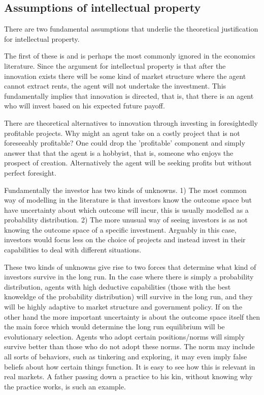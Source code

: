 \subsection{Assumptions of intellectual property}


There are two fundamental assumptions that underlie the theoretical justification for intellectual property. 

The first of these is  and is perhaps the most commonly ignored in the economics literature. Since the argument for intellectual property is that after the innovation exists there will be some kind of market structure where the agent cannot extract rents, the agent will not undertake the investment. This fundamentally implies that innovation is directed, that is, that there is an agent who will invest based on his expected future payoff.

There are theoretical alternatives to innovation through investing in foresightedly profitable projects. Why might an agent take on a costly project that is not foreseeably profitable? One could drop the 'profitable' component and simply answer that that the agent is a hobbyist, that is, someone who enjoys the prospect of creation. Alternatively the agent will be seeking profits but without perfect foresight. 

Fundamentally the investor has two kinds of unknowns. 1) The most common way of modelling in the literature is that investors know the outcome space but have uncertainty about which outcome will incur, this is usually modelled as a probability distribution. 2) The more unusual way of seeing investors is as not knowing the outcome space of a specific investment. Arguably in this case, investors would focus less on the choice of projects and instead invest in their capabilities to deal with different situations. 

These two kinds of unknowns give rise to two forces that determine what kind of investors survive in the long run. In the case where there is simply a probability distribution, agents with high deductive capabilities (those with the best knoweldge of the probability distribution) will survive in the long run, and they will be highly adaptive to market structure and government policy. If on the other hand the more important uncertainty is about the outcome space itself then the main force which would determine the long run equilibrium will be evolutionary selection. Agents who adopt certain positions/norms will simply survive better than those who do not adopt these norms. The norm may include all sorts of behaviors, such as tinkering and exploring, it may even imply false beliefs about how certain things function. It is easy to see how this is relevant in real markets. A father passing down a practice to his kin, without knowing why the practice works, is such an example. 


